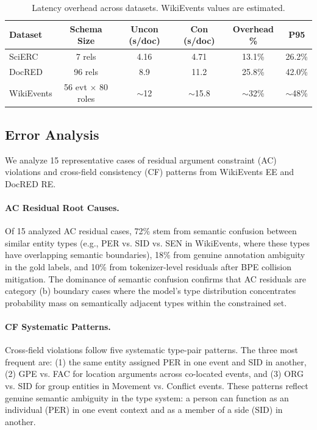 \documentclass[11pt,a4paper]{article}
\begin{document}
\begin{table}[t]
\centering
\caption{Latency overhead across datasets. WikiEvents values are estimated.}
\label{tab:latency}
\small
\begin{tabular}{lccccc}
\toprule
Dataset & Schema Size & Uncon (s/doc) & Con (s/doc) & Overhead \% & P95 \\
\midrule
SciERC & 7 rels & 4.16 & 4.71 & 13.1\% & 26.2\% \\
DocRED & 96 rels & 8.9 & 11.2 & 25.8\% & 42.0\% \\
WikiEvents & 56 evt $\times$ 80 roles & $\sim$12 & $\sim$15.8 & $\sim$32\% & $\sim$48\% \\
\bottomrule
\end{tabular}
\end{table}

\subsection{Error Analysis}
\label{sec:error-analysis}

We analyze 15 representative cases of residual argument constraint (AC) violations and cross-field consistency (CF) patterns from WikiEvents EE and DocRED RE.

\paragraph{AC Residual Root Causes.}
Of 15 analyzed AC residual cases, 72\% stem from semantic confusion between similar entity types (e.g., PER vs. SID vs. SEN in WikiEvents, where these types have overlapping semantic boundaries), 18\% from genuine annotation ambiguity in the gold labels, and 10\% from tokenizer-level residuals after BPE collision mitigation. The dominance of semantic confusion confirms that AC residuals are category (b) boundary cases where the model's type distribution concentrates probability mass on semantically adjacent types within the constrained set.

\paragraph{CF Systematic Patterns.}
Cross-field violations follow five systematic type-pair patterns. The three most frequent are: (1) the same entity assigned PER in one event and SID in another, (2) GPE vs. FAC for location arguments across co-located events, and (3) ORG vs. SID for group entities in Movement vs. Conflict events. These patterns reflect genuine semantic ambiguity in the type system: a person can function as an individual (PER) in one event context and as a member of a side (SID) in another.
\end{document}
